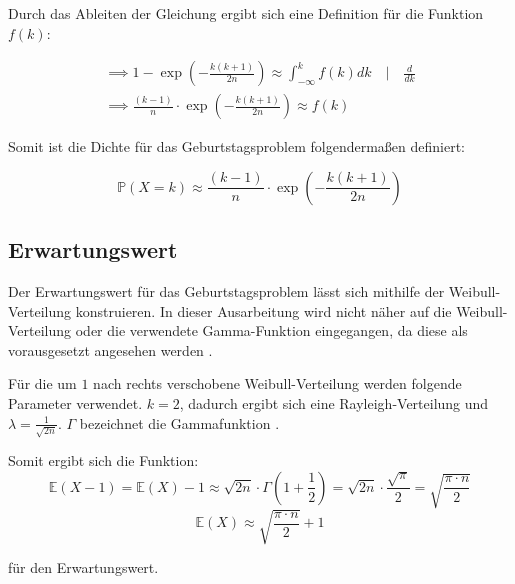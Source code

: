 \documentclass[../main.tex]{subfiles}
\begin{document}
\begin{flushleft}
        Durch das Ableiten der Gleichung ergibt sich eine Definition für die Funktion $f(k)$:

        \begin{eqnarray}
            \implies 1 - \exp( - \frac{ k (k + 1) }{ 2n } ) \approx \int_{ -\infty }^{ k }{ f(k) dk } \quad | \quad \frac{ d }{ dk }\\
            \implies \frac{ (k-1) }{ n } \cdot \exp( - \frac{ k (k + 1) }{ 2n } ) \approx f(k)
        \end{eqnarray}

        Somit ist die Dichte für das Geburtstagsproblem folgendermaßen definiert:

        \begin{equation}
            \mathbb{P}(X = k) \approx \frac{ (k-1) }{ n } \cdot \exp( - \frac{ k (k + 1) }{ 2n } )
        \end{equation}

        \subsection{Erwartungswert}\label{subsec:erwartungswert}

        Der Erwartungswert für das Geburtstagsproblem lässt sich mithilfe der Weibull-Verteilung konstruieren.
        In dieser Ausarbeitung wird nicht näher auf die Weibull-Verteilung oder die verwendete Gamma-Funktion eingegangen, da diese als vorausgesetzt angesehen werden \cite{rinne}.  \newline

        Für die um $1$ nach rechts verschobene Weibull-Verteilung werden folgende Parameter verwendet. $k = 2$, dadurch ergibt sich eine Rayleigh-Verteilung und $\lambda = \frac{ 1 }{ \sqrt{2n} }$.
        $\Gamma$ bezeichnet die Gammafunktion \cite{rinne}. \newline

        Somit ergibt sich die Funktion:
        \begin{equation}
            \mathbb{E}(X - 1) = \mathbb{E}(X) - 1 \approx \sqrt{ 2n } \cdot \Gamma (1 + \frac{ 1 }{ 2 } ) = \sqrt{ 2n } \cdot \frac{ \sqrt{ \pi } }{ 2 } = \sqrt{ \frac{ \pi \cdot n }{ 2 } }
        \end{equation}
        \begin{equation}
            \mathbb{E}(X) \approx \sqrt{ \frac{ \pi \cdot n }{ 2 } } + 1
        \end{equation}

        für den Erwartungswert.


\end{flushleft}
\end{document}
